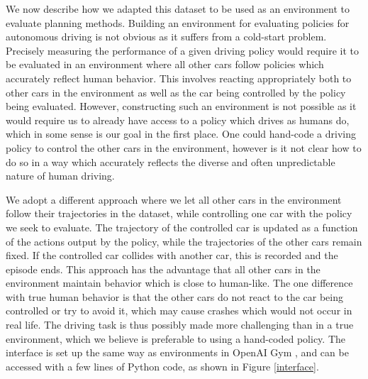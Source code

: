 \documentclass{article} %
\begin{document}


We now describe how we adapted this dataset to be used as an environment to evaluate planning methods.
Building an environment for evaluating policies for autonomous driving is not obvious as it suffers from a cold-start problem.
Precisely measuring the performance of a given driving policy would require it to be evaluated in an environment where all other cars follow policies which accurately reflect human behavior.
This involves reacting appropriately both to other cars in the environment as well as the car being controlled by the policy being evaluated.
However, constructing such an environment is not possible as it would require us to already have access to a policy which drives as humans do, which in some sense is our goal in the first place. One could hand-code a driving policy to control the other cars in the environment, however is it not clear how to do so in a way which accurately reflects the diverse and often unpredictable nature of human driving.

We adopt a different approach where we let all other cars in the environment follow their trajectories in the dataset, while controlling one car with the policy we seek to evaluate.
The trajectory of the controlled car is updated as a function of the actions output by the policy, while the trajectories of the other cars remain fixed.
If the controlled car collides with another car, this is recorded and the episode ends.
This approach has the advantage that all other cars in the environment maintain behavior which is close to human-like.
The one difference with true human behavior is that the other cars do not react to the car being controlled or try to avoid it, which may cause crashes which would not occur in real life.
The driving task is thus possibly made more challenging than in a true environment, which we believe is preferable to using a hand-coded policy.
The interface is set up the same way as environments in OpenAI Gym \citep{OpenAIBaselines}, and can be accessed with a few lines of Python code, as shown in Figure \ref{interface}.
\end{document}
